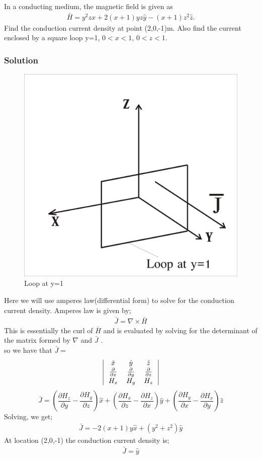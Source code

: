 \begin{exmp}
In a conducting medium, the magnetic field is given as
\begin{align*}
\bar{H}=y^{2}z\hat{x}+2(x+1)yz\hat{y}-(x+1)z^{2}\hat{z}.
\end{align*}
Find the conduction current density at point (2,0,-1)m. Also find the current enclosed by a square loop y=1, $0<x<1$, $0<z<1$.
\subsubsection*{Solution}
\begin{figure}[h]
\centering
\includegraphics[width=.5\linewidth]{./graphics/problem3b}
\caption{Loop at y=1}
\end{figure} 

Here we will use amperes law(differential form) to solve for the conduction current density. Amperes law is given by;
\begin{align*}
\bar{J}=\nabla\times\bar{H}
\end{align*}
This is essentially the curl of $\bar{H}$ and is evaluated by solving for the determinant of the matrix formed by $\nabla$ and $\bar{J}$ .\\
so we have that $\bar{J} =$
\[
\left|
\begin{tabular}{c c c}
$\hat{x}$ & $\hat{y}$ & $\hat{z}$\\
$\frac{\partial}{\partial x}$ & $\frac{\partial}{\partial y}$ & $\frac{\partial}{\partial z}$\\
$H_{x}$ & $H_{y}$ & $H_{z}$
\end{tabular}
\right|
\]
\begin{dmath*}
\bar{J}= (\frac{\partial H_{z}}{\partial y}-\frac{\partial H_{y}}{\partial z})\hat{x}+ (\frac{\partial H_{x}}{\partial z}-\frac{\partial H_{z}}{\partial x})\hat{y}+ (\frac{\partial H_{y}}{\partial x}-\frac{\partial H_{x}}{\partial y})\hat{z}
\end{dmath*}
Solving, we get;
\begin{align*}
\bar{J}=-2(x+1)y\hat{x}+(y^{2}+z^{2})\hat{y}
\end{align*}
At location (2,0,-1) the conduction current density is;
\begin{align*}
\bar{J}=\hat{y}
\end{align*}


\end{exmp}
